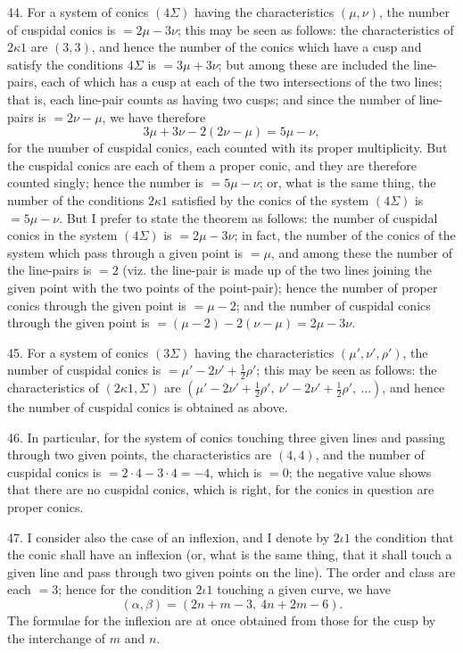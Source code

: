 \documentclass[12pt,a4paper]{article}
\begin{document}
44. For a system of conics $(4\Sigma)$ having the characteristics $(\mu, \nu)$, the number of cuspidal conics is $= 2\mu - 3\nu$; this may be seen as follows: the characteristics of $2\kappa 1$ are $(3, 3)$, and hence the number of the conics which have a cusp and satisfy the conditions $4\Sigma$ is $= 3\mu + 3\nu$; but among these are included the line-pairs, each of which has a cusp at each of the two intersections of the two lines; that is, each line-pair counts as having two cusps; and since the number of line-pairs is $= 2\nu - \mu$, we have therefore
\[
3\mu + 3\nu - 2(2\nu - \mu) = 5\mu - \nu,
\]
for the number of cuspidal conics, each counted with its proper multiplicity. But the cuspidal conics are each of them a proper conic, and they are therefore counted singly; hence the number is $= 5\mu - \nu$; or, what is the same thing, the number of the conditions $2\kappa 1$ satisfied by the conics of the system $(4\Sigma)$ is $= 5\mu - \nu$. But I prefer to state the theorem as follows: the number of cuspidal conics in the system $(4\Sigma)$ is $= 2\mu - 3\nu$; in fact, the number of the conics of the system which pass through a given point is $= \mu$, and among these the number of the line-pairs is $= 2$ (viz. the line-pair is made up of the two lines joining the given point with the two points of the point-pair); hence the number of proper conics through the given point is $= \mu - 2$; and the number of cuspidal conics through the given point is $= (\mu - 2) - 2(\nu - \mu) = 2\mu - 3\nu$.

45. For a system of conics $(3\Sigma)$ having the characteristics $(\mu', \nu', \rho')$, the number of cuspidal conics is $= \mu' - 2\nu' + \tfrac{1}{2}\rho'$; this may be seen as follows: the characteristics of $(2\kappa 1, \Sigma)$ are $(\mu' - 2\nu' + \tfrac{1}{2}\rho',\ \nu' - 2\nu' + \tfrac{1}{2}\rho',\ \dots)$, and hence the number of cuspidal conics is obtained as above.

46. In particular, for the system of conics touching three given lines and passing through two given points, the characteristics are $(4, 4)$, and the number of cuspidal conics is $= 2 \cdot 4 - 3 \cdot 4 = -4$, which is $= 0$; the negative value shows that there are no cuspidal conics, which is right, for the conics in question are proper conics.

47. I consider also the case of an inflexion, and I denote by $2\iota 1$ the condition that the conic shall have an inflexion (or, what is the same thing, that it shall touch a given line and pass through two given points on the line). The order and class are each $= 3$; hence for the condition $2\iota 1$ touching a given curve, we have
\[
(\alpha, \beta) = (2n + m - 3,\ 4n + 2m - 6).
\]
The formulae for the inflexion are at once obtained from those for the cusp by the interchange of $m$ and $n$.
\end{document}
